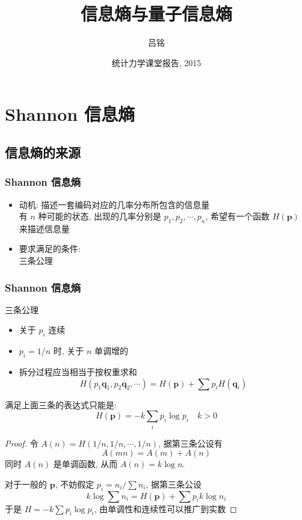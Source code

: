 \documentclass[12pt,hyperref={CJKbookmarks=true}]{beamer}
\title{信息熵与量子信息熵}
\author{吕铭}
\institute{清华大学物理系}
\date{统计力学课堂报告, 2015}
\renewcommand*{\vec}[1]{\bm{#1}}
\begin{document}
\begin{frame}
\titlepage
\end{frame}
\begin{frame}
    \tableofcontents
\end{frame}
\section{Shannon 信息熵} %
\label{sec:Shannon_entropy}
\subsection{信息熵的来源} %
\label{ssub:The_concept}
\begin{frame}%
    \frametitle{Shannon 信息熵}
    \begin{itemize}
        \item 动机: 描述一套编码对应的几率分布所包含的信息量\\
        有 $n$ 种可能的状态, 出现的几率分别是 $p_1, p_2, \cdots, p_n$, 希望有一个函数 $H(\vec p)$ 来描述信息量\pause
        \item 要求满足的条件:\\
        三条公理\cite{Shannonentropy}
    \end{itemize}
\end{frame}
\begin{frame}[allowframebreaks]
    \frametitle{Shannon 信息熵}
    三条公理\cite{Shannonentropy}
    \begin{itemize}
        \item 关于 $p_i$ 连续
        \item $p_i = 1/n$ 时, 关于 $n$ 单调增的
        \item 拆分过程应当相当于按权重求和
        \begin{equation}
            H(p_1\vec q_1, p_2\vec q_2, \cdots) = H(\vec p) + \sum p_iH(\vec q_i)
        \end{equation}
    \end{itemize}
    满足上面三条的表达式只能是:
    \begin{equation}
        H(\vec p) = -k\sum_i p_i\log p_i\quad k>0
    \end{equation}
    \begin{proof}
        令 $A(n) = H(1/n,1/n,\cdots,1/n)$, 据第三条公设有
        \begin{equation}
            A(mn) = A(m) + A(n)
        \end{equation}
        同时 $A(n)$ 是单调函数, 从而 $A(n) = k\log n$.

        对于一般的 $\vec p$, 不妨假定 $p_i = n_i/\sum n_i$, 据第三条公设
        \begin{equation}
            k\log\sum n_i = H(\vec p) + \sum p_i k\log n_i
        \end{equation}
        于是 $H = -k\sum p_i\log p_i$, 由单调性和连续性可以推广到实数
    \end{proof}
\end{frame}
\end{document}
